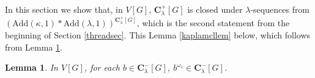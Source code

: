 \documentclass[12pt]{article}
\newtheorem{lemma}[theorem]{Lemma}
\def\bbC{{\mathbf{C}}}
\renewcommand{\models}{\vDash}
\def\l{\lambda}
\newcommand{\Add}{\mathrm{Add}}
\newcommand{\bbR}{\mathbb{R}}
\newcommand{\breals}{\omega^{\omega}}
\newcommand{\DC}{\mathsf{DC}}
\newcommand{\cP}{\mathcal{P}}
\newcommand{\cof}{\mathrm{cof}}
\newcommand{\bls}{\vspace{\baselineskip}}
\begin{document}




In this section we show that, in $V[G]$, $\bbC^{+}_{\lambda}[G]$ is closed under $\lambda$-sequences from
$(\Add(\kappa, 1) * \Add(\lambda, 1))^{\bbC^{+}_{\lambda}[G]}$, which is the second statement from the beginning of Section \ref{threadsec}. This Lemma \ref{kaplamcllem} below, which follows from Lemma \ref{omega1 functions}.


\begin{lemma}\label{omega1 functions} In $V[G]$, for each $b\in \bbC^-_{\lambda}[G]$,
$b^{\omega_1}\in \bbC^{-}_{\lambda}[G]$.
\end{lemma}
\end{document}
